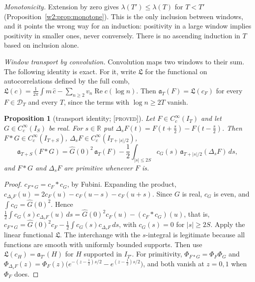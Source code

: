 \documentclass[11pt]{amsart}
\newtheorem{proposition}[theorem]{Proposition}
\theoremstyle{definition}
\theoremstyle{remark}
\numberwithin{equation}{section}
\newcommand{\R}{\mathbb{R}}
\DeclareMathOperator{\Rel}{Re}
\newcommand{\IT}{I_T}                                  %
\newcommand{\cF}{c_F}                                  %
\newcommand{\PhiF}{\Phi_F}                             %
\newcommand{\DT}{\mathcal{D}_T}                        %
\newcommand{\aT}{\mathfrak{a}_T}                       %
\newcommand{\stag}[1]{\textsc{[#1]}}
\newcommand{\PROVED}{\stag{proved}}
\begin{document}
\emph{Monotonicity.} Extension by zero gives $\lambda(T')\le\lambda(T)$ for $T<T'$
(Proposition~\ref{w2:prop:monotone}). This is the only inclusion between windows, and it points the wrong way for an
induction: positivity in a large window implies positivity in smaller ones, never conversely. There is no ascending
induction in $T$ based on inclusion alone.

\emph{Window transport by convolution.} Convolution maps two windows to their sum. The following identity is exact.
For it, write $\mathfrak L$ for the functional on autocorrelations defined by the full comb,
$\mathfrak L(c)=\frac1{2\pi}\int m\,\widehat c-\sum_{n\ge2}v_n\Rel c(\log n)$. Then $\aT(F)=\mathfrak L(\cF)$ for every
$F\in\DT$ and every $T$, since the terms with $\log n\ge2T$ vanish.

\begin{proposition}[transport identity; \PROVED]\label{w8:prop:transport}
Let $F\in C_c^\infty(\IT)$ and let $G\in C_c^\infty(I_S)$ be real. For $s\in\R$ put
$\Delta_sF(t)=F(t+\tfrac s2)-F(t-\tfrac s2)$. Then $F*G\in C_c^\infty(I_{T+S})$, $\Delta_sF\in C_c^\infty(I_{T+|s|/2})$,
\begin{equation}\label{w8:eq:transport}
  \mathfrak a_{T+S}(F*G)=\widehat G(0)^2\,\aT(F)-\frac12\int_{|s|\le2S}c_G(s)\,\mathfrak a_{T+|s|/2}(\Delta_sF)\,ds,
\end{equation}
and $F*G$ and $\Delta_sF$ are primitive whenever $F$ is.
\end{proposition}

\begin{proof}
$c_{F*G}=\cF*c_G$, by Fubini. Expanding the product,
$c_{\Delta_sF}(u)=2\cF(u)-\cF(u-s)-\cF(u+s)$. Since $G$ is real, $c_G$ is even, and $\int c_G=\widehat G(0)^2$. Hence
$\frac12\int c_G(s)c_{\Delta_sF}(u)\,ds=\widehat G(0)^2\cF(u)-(\cF*c_G)(u)$, that is,
$c_{F*G}=\widehat G(0)^2\cF-\frac12\int c_G(s)c_{\Delta_sF}\,ds$, with $c_G(s)=0$ for $|s|\ge2S$. Apply the linear
functional $\mathfrak L$. The interchange with the $s$-integral is legitimate because all functions are smooth with
uniformly bounded supports. Then use $\mathfrak L(c_H)=\mathfrak a_{T'}(H)$ for $H$ supported in $I_{T'}$. For
primitivity, $\Phi_{F*G}=\PhiF\Phi_G$ and
$\Phi_{\Delta_sF}(z)=\PhiF(z)\bigl(e^{-(z-\frac12)s/2}-e^{(z-\frac12)s/2}\bigr)$, and both vanish at $z=0,1$ when
$\PhiF$ does.
\end{proof}
\end{document}
